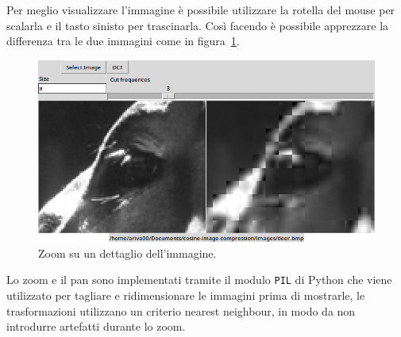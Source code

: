 \documentclass[a4paper, 12pt]{article}
\begin{document}
Per meglio visualizzare l'immagine è possibile utilizzare la rotella del mouse 
per scalarla e il tasto sinisto per trascinarla. Così facendo è possibile
apprezzare la differenza tra le due immagini come in 
figura~\ref{fig:zoomed-detail}.

\begin{figure}[h]
  \includegraphics[width=\textwidth]{./imgs/zoomed-detail.png}
  \caption{Zoom su un dettaglio dell'immagine.}
  \label{fig:zoomed-detail}
\end{figure}

Lo zoom e il pan sono implementati tramite il modulo \texttt{PIL} di Python che
viene utilizzato per tagliare e ridimensionare le immagini prima di mostrarle, 
le trasformazioni utilizzano un criterio nearest neighbour, in modo da non 
introdurre artefatti durante lo zoom.
\end{document}

